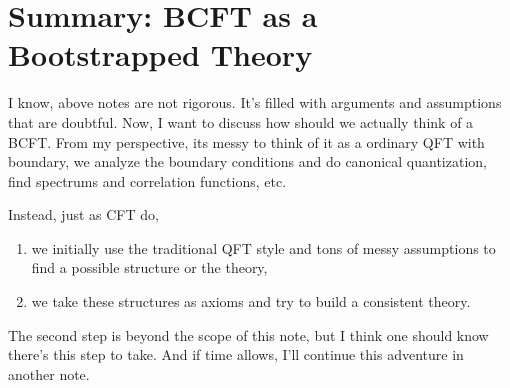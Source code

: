 \section{Summary: BCFT as a Bootstrapped Theory}

I know, above notes are not rigorous. It's filled with arguments and
assumptions that are doubtful. Now, I want to discuss how should we
actually think of a BCFT. From my perspective, its messy to think of it as a ordinary QFT with
boundary, we analyze the boundary conditions and do canonical
quantization, find spectrums and correlation functions, etc.

Instead, just as CFT do, 
\begin{enumerate}
  \item we initially use the traditional QFT style
and tons of messy assumptions to find a possible structure or the
theory,
\item we take these structures as axioms and try to build
a consistent theory. 
\end{enumerate}
The second step is beyond the scope of this
note, but I think one should know there's this step to take. And if
time allows, I'll continue this adventure in another note.


